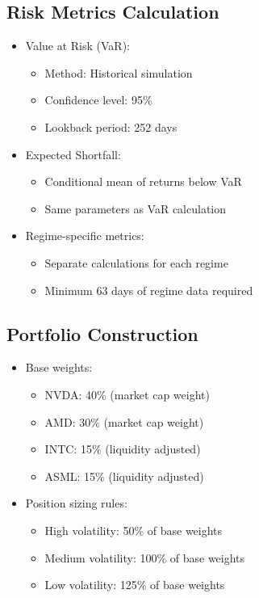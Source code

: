 \subsection{Risk Metrics Calculation}
\begin{itemize}
    \item Value at Risk (VaR):
        \begin{itemize}
            \item Method: Historical simulation
            \item Confidence level: 95\%
            \item Lookback period: 252 days
        \end{itemize}
    \item Expected Shortfall:
        \begin{itemize}
            \item Conditional mean of returns below VaR
            \item Same parameters as VaR calculation
        \end{itemize}
    \item Regime-specific metrics:
        \begin{itemize}
            \item Separate calculations for each regime
            \item Minimum 63 days of regime data required
        \end{itemize}
\end{itemize}

\subsection{Portfolio Construction}
\begin{itemize}
    \item Base weights:
        \begin{itemize}
            \item NVDA: 40\% (market cap weight)
            \item AMD: 30\% (market cap weight)
            \item INTC: 15\% (liquidity adjusted)
            \item ASML: 15\% (liquidity adjusted)
        \end{itemize}
    \item Position sizing rules:
        \begin{itemize}
            \item High volatility: 50\% of base weights
            \item Medium volatility: 100\% of base weights
            \item Low volatility: 125\% of base weights
        \end{itemize}
\end{itemize}

